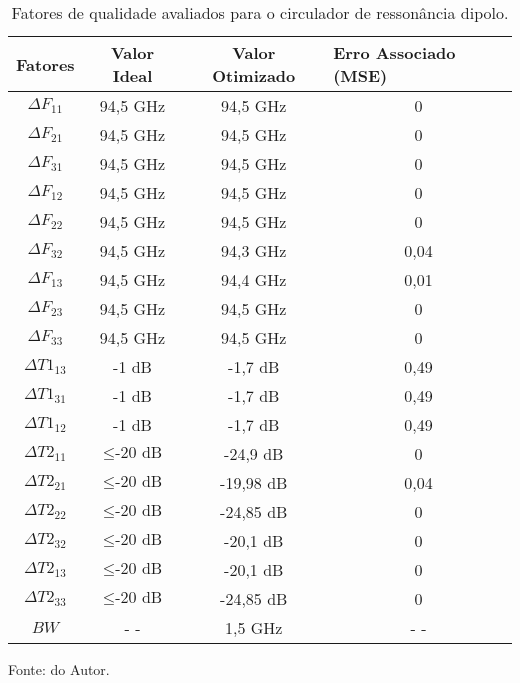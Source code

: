 



\begin{table}[H]
    \centering
    \caption{Fatores de qualidade avaliados para o circulador de ressonância dipolo.}
    \begin{tabular}{cccc}
\hline
Fatores          & Valor Ideal            & Valor Otimizado & \multicolumn{1}{l}{Erro Associado (MSE)} \\ \hline
$\Delta F_{11}$  & 94,5 GHz               & 94,5 GHz        & 0                                        \\
$\Delta F_{21}$  & 94,5 GHz               & 94,5 GHz        & 0                                        \\
$\Delta F_{31}$  & 94,5 GHz               & 94,5 GHz        & 0                                        \\
$\Delta F_{12}$  & 94,5 GHz               & 94,5 GHz        & 0                                        \\
$\Delta F_{22}$  & 94,5 GHz               & 94,5 GHz        & 0                                        \\
$\Delta F_{32}$  & 94,5 GHz               & 94,3 GHz        & 0,04                                     \\
$\Delta F_{13}$  & 94,5 GHz               & 94,4 GHz        & 0,01                                     \\
$\Delta F_{23}$  & 94,5 GHz               & 94,5 GHz        & 0                                        \\
$\Delta F_{33}$  & 94,5 GHz               & 94,5 GHz        & 0                                        \\
$\Delta T1_{13}$ & -1 dB                  & -1,7 dB         & 0,49                                     \\
$\Delta T1_{31}$ & -1 dB                  & -1,7 dB         & 0,49                                     \\
$\Delta T1_{12}$ & -1 dB                  & -1,7 dB         & 0,49                                     \\
$\Delta T2_{11}$ & $\leq \textrm{-20 dB}$ & -24,9 dB        & 0                                        \\
$\Delta T2_{21}$ & $\leq \textrm{-20 dB}$ & -19,98 dB       & 0,04                                     \\
$\Delta T2_{22}$ & $\leq \textrm{-20 dB}$ & -24,85 dB       & 0                                        \\
$\Delta T2_{32}$ & $\leq \textrm{-20 dB}$ & -20,1 dB        & 0                                        \\
$\Delta T2_{13}$ & $\leq \textrm{-20 dB}$ & -20,1 dB        & 0                                        \\
$\Delta T2_{33}$ & $\leq \textrm{-20 dB}$ & -24,85 dB       & 0                                        \\
$BW$             & - -                    & 1,5 GHz         & - -                                      \\ \hline
\end{tabular}

    \label{tab: FQ_Dipolo}

    \vspace{2.5mm}
    Fonte: do Autor.

    \end{table}